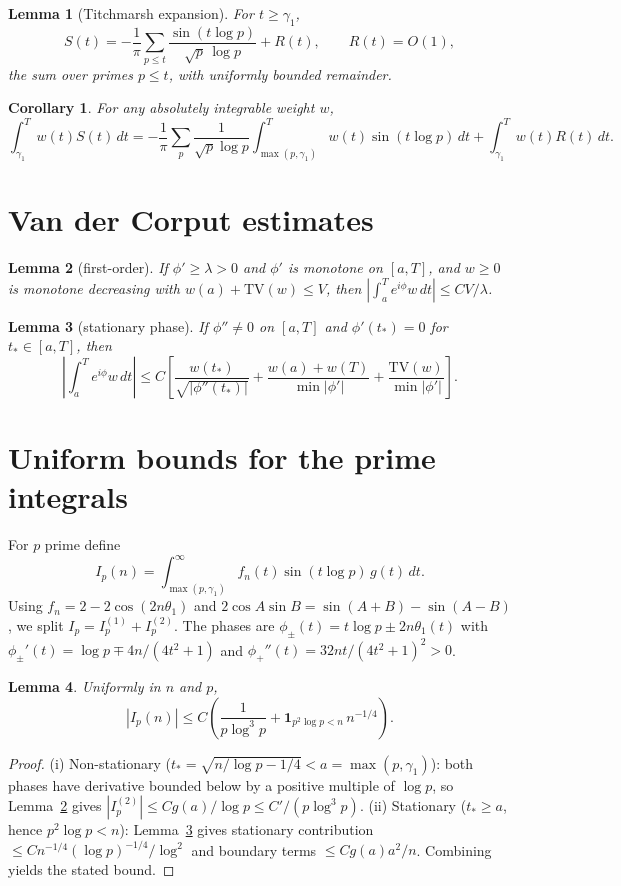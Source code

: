 \documentclass[11pt]{article}
\newtheorem{lemma}{Lemma}
\newtheorem{corollary}{Corollary}
\begin{document}
\begin{lemma}[Titchmarsh expansion]
\label{lem:1}
For $t\ge\gamma_1$,
\[
S(t)=-\frac1\pi\sum_{p\le t}\frac{\sin(t\log p)}{\sqrt p\,\log p}+R(t),
\qquad R(t)=O(1),
\]
the sum over primes $p\le t$, with uniformly bounded remainder.
\end{lemma}

\begin{corollary}
For any absolutely integrable weight $w$,
\[
\int_{\gamma_1}^{T}w(t)S(t)\,dt
=-\frac1\pi\sum_p\frac{1}{\sqrt p\log p}
\int_{\max(p,\gamma_1)}^{T}w(t)\sin(t\log p)\,dt
+\int_{\gamma_1}^{T}w(t)R(t)\,dt.
\]
\end{corollary}

\section{Van der Corput estimates}
\begin{lemma}[first-order]
\label{lem:2}
If $\phi'\ge\lambda>0$ and $\phi'$ is monotone on $[a,T]$, and $w\ge0$ is
monotone decreasing with $w(a)+\mathrm{TV}(w)\le V$, then
$\left|\int_a^T e^{i\phi}w\,dt\right|\le CV/\lambda$.
\end{lemma}

\begin{lemma}[stationary phase]
\label{lem:3}
If $\phi''\ne0$ on $[a,T]$ and $\phi'(t_*)=0$ for $t_*\in[a,T]$, then
\[
\left|\int_a^T e^{i\phi}w\,dt\right|
\le C\left[\frac{w(t_*)}{\sqrt{|\phi''(t_*)|}}
+\frac{w(a)+w(T)}{\min|\phi'|}+\frac{\mathrm{TV}(w)}{\min|\phi'|}\right].
\]
\end{lemma}

\section{Uniform bounds for the prime integrals}
For $p$ prime define
\[
I_p(n)=\int_{\max(p,\gamma_1)}^{\infty}
f_n(t)\sin(t\log p)\,g(t)\,dt.
\]
Using $f_n=2-2\cos(2n\theta_1)$ and
$2\cos A\sin B=\sin(A+B)-\sin(A-B)$, we split $I_p=I_p^{(1)}+I_p^{(2)}$.
The phases are $\phi_\pm(t)=t\log p\pm 2n\theta_1(t)$ with
$\phi_\pm'(t)=\log p\mp 4n/(4t^2+1)$ and
$\phi_+''(t)=32nt/(4t^2+1)^2>0$.

\begin{lemma}\label{lem:4}
Uniformly in $n$ and $p$,
\[
|I_p(n)|\le
C\left(\frac1{p\log^3 p}+\mathbf{1}_{p^2\log p<n}\,n^{-1/4}\right).
\]
\end{lemma}
\begin{proof}
(i) Non-stationary ($t_*=\sqrt{n/\log p-1/4}<a=\max(p,\gamma_1)$):
both phases have derivative bounded below by a positive multiple of $\log p$,
so Lemma~\ref{lem:2} gives $|I_p^{(2)}|\le Cg(a)/\log p\le C'/(p\log^3 p)$.
(ii) Stationary ($t_*\ge a$, hence $p^2\log p<n$): Lemma~\ref{lem:3} gives
stationary contribution $\le Cn^{-1/4}(\log p)^{-1/4}/\log^2$ and boundary
terms $\le Cg(a)a^2/n$. Combining yields the stated bound.
\end{proof}
\end{document}
